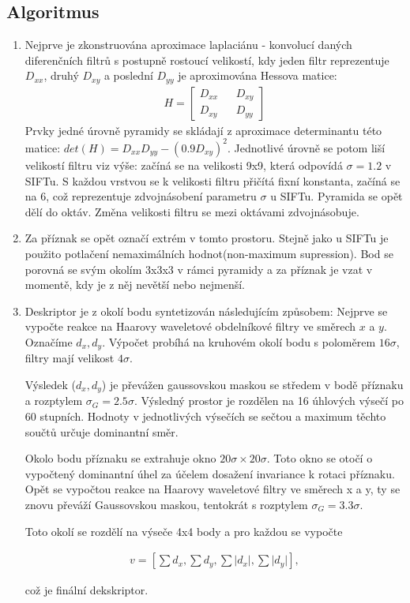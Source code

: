\subsection{Algoritmus}

	\begin{enumerate}
		\item Nejprve je zkonstruována aproximace laplaciánu - konvolucí daných diferenčních filtrů s postupně rostoucí velikostí, kdy jeden filtr reprezentuje $D_{xx}$, druhý $D_{xy}$ a poslední $D_{yy}$ je aproximována Hessova matice:
		\begin{align}
			H = \begin{bmatrix}
			D_{xx} && D_{xy} \\ 
			D_{xy} && D_{yy}
			\end{bmatrix}
		\end{align}
		Prvky jedné úrovně pyramidy se skládají z aproximace determinantu této matice: $det(H) = D_{xx}D_{yy} - (0.9D_{xy})^2$. Jednotlivé úrovně se potom liší velikostí filtru viz výše: začíná se na velikosti 9x9, která odpovídá $\sigma = 1.2$ v SIFTu. S každou vrstvou se k velikosti filtru přičítá fixní konstanta, začíná se na 6, což reprezentuje zdvojnásobení parametru $\sigma$ u SIFTu. Pyramida se opět dělí do oktáv. Změna velikosti filtru se mezi oktávami zdvojnásobuje.
			
		\item Za příznak se opět označí extrém v tomto prostoru. Stejně jako u SIFTu je použito potlačení nemaximálních hodnot(non-maximum supression). Bod se porovná se svým okolím 3x3x3 v rámci pyramidy a za příznak je vzat v momentě, kdy je z něj nevětší nebo nejmenší.
		
		\item Deskriptor je z okolí bodu syntetizován následujícím způsobem: Nejprve se vypočte reakce na Haarovy waveletové obdelníkové filtry ve směrech $x$ a $y$. Označíme $d_x, d_y$. Výpočet probíhá na kruhovém okolí bodu s poloměrem $16\sigma$, filtry mají velikost $4\sigma$. 
		
		Výsledek ($d_x, d_y$) je převážen gaussovskou maskou se středem v bodě příznaku a rozptylem $\sigma_{G} = 2.5\sigma{}$. Výsledný prostor je rozdělen na 16 úhlových výsečí po 60 stupních. Hodnoty v jednotlivých výsečích se sečtou a maximum těchto součtů určuje dominantní směr.
		
		Okolo bodu příznaku se extrahuje okno $20\sigma{} \times 20\sigma{}$. Toto okno se otočí o vypočtený dominantní úhel za účelem dosažení invariance k rotaci příznaku. Opět se vypočtou reakce na Haarovy waveletové filtry ve směrech x a y, ty se znovu převáží Gaussovskou maskou, tentokrát s rozptylem $\sigma_G = 3.3\sigma$. 
		
		Toto okolí se rozdělí na výseče 4x4 body a pro každou se vypočte 
		
		\begin{align}
		v = [\sum d_x, \sum d_y, \sum\lvert d_x \rvert, \sum\lvert d_y \rvert ],
		\end{align}
		
		což je finální dekskriptor.
		
	\end{enumerate}
	
